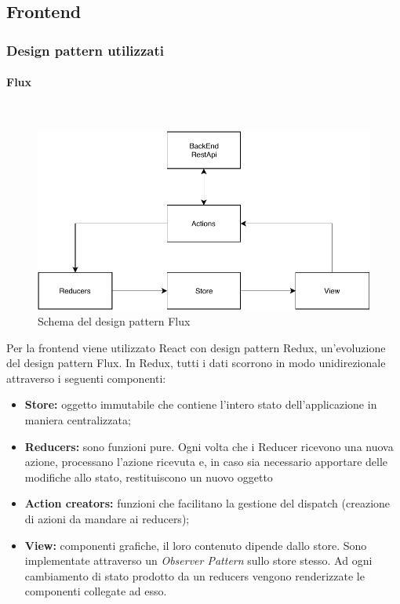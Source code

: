 \subsection{Frontend}
\subsubsection{Design pattern utilizzati}
\paragraph{Flux}\mbox{}\\

\begin{figure}[H]
    \centering
	\includegraphics[width=0.7\linewidth]{img/Flux.pdf}
	\caption{Schema del design pattern Flux}
\end{figure}

Per la frontend viene utilizzato React con design pattern Redux, un'evoluzione del design pattern Flux.
In Redux, tutti i dati scorrono in modo unidirezionale attraverso i seguenti componenti:
\begin{itemize}
    \item \textbf{Store: }oggetto immutabile che contiene l'intero stato dell'applicazione in maniera centralizzata;
    \item \textbf{Reducers: }sono funzioni pure. Ogni volta che i Reducer ricevono una nuova azione, 
    processano l'azione ricevuta e, in caso sia necessario apportare delle modifiche allo stato, restituiscono un nuovo oggetto 
    \item \textbf{Action creators: }funzioni che facilitano la gestione del dispatch (creazione di azioni da mandare ai reducers); 
    \item \textbf{View: }componenti grafiche, il loro contenuto dipende dallo store. Sono implementate attraverso un \textit{Observer Pattern} sullo store stesso.
    Ad ogni cambiamento di stato prodotto da un reducers vengono renderizzate le componenti collegate ad esso.
\end{itemize} 

